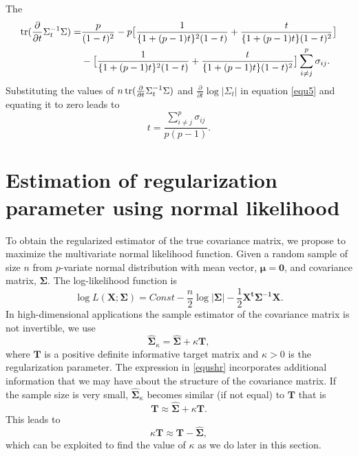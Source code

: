 The 
\begin{equation}
\begin{split}
\tr(\frac{\partial}{\partial t} \Sigma_{t}^{-1} \Sigma) =& \frac{p}{(1-t)^2} - p \big [ \frac{1}{\lbrace1+(p-1)t\rbrace^2 (1-t)} + \frac{t}{\lbrace1+(p-1)t\rbrace(1-t)^2} \big ]\\
& - \big [ \frac{1}{\lbrace1+(p-1)t\rbrace^2 (1-t)} + \frac{t}{\lbrace1+(p-1)t\rbrace(1-t)^2} \big ] \sum_{i \neq j}^{p} \sigma_{ij}.
 \end{split}   
  \label{equ15}
\end{equation}
Substituting the values of $n \, \mbox{tr}(\frac{\partial}{\partial t} \Sigma_{t}^{-1} \Sigma)$ and $\frac{\partial}{\partial t} \log|\Sigma_{t}|$ in equation \ref{equ5} and equating it to zero leads to
\begin{equation}
t = \frac{\sum_{i \neq j}^{p} \sigma_{ij}}{p(p-1)}.
\label{equ16}
\end{equation}
 

\section{Estimation of regularization parameter using normal likelihood} \label{sec3}
To obtain the regularized estimator of the true covariance matrix, we propose to maximize the multivariate normal likelihood function. Given a random sample of size $n$ from $p$-variate normal distribution with mean vector, $\boldsymbol{\mu=0}$, and covariance matrix, $\boldsymbol{\Sigma}$. The log-likelihood function is
\begin{equation}
\log L(\boldsymbol{X};\boldsymbol{\Sigma})= Const - \frac{n}{2} \log\left|\boldsymbol{\Sigma}\right|-\frac{1}{2}\boldsymbol{X^t \Sigma^{-1} X}. 
\label{equ17} 
\end{equation}
In high-dimensional applications the sample estimator of the covariance matrix is not invertible, we use
\begin{equation}
\boldsymbol{\hat{\Sigma}}_{\kappa} = \boldsymbol{\hat{\Sigma}} + \kappa \boldsymbol{T},
\label{equshr}
\end{equation} 
where $\boldsymbol{T}$ is a positive definite informative target matrix and $\kappa > 0$ is the regularization parameter. The expression in \ref{equshr} incorporates additional information that we may have about the structure of the covariance matrix. If the sample size is very small, $\boldsymbol{\hat{\Sigma}}_{\kappa}$ becomes similar (if not equal) to $\boldsymbol{T}$ that is  
\begin{equation*}
\boldsymbol{T} \approx \boldsymbol{\hat{\Sigma}} + \kappa \boldsymbol{T}.
\end{equation*}
This leads to 
\begin{equation}
\kappa\boldsymbol{T} \approx \boldsymbol{T}-\boldsymbol{\hat{\Sigma}},
\label{equnshr}
\end{equation}
which can be exploited to find the value of $\kappa$ as we do later in this section.

